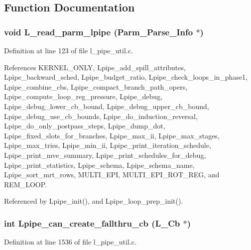 \subsection{Function Documentation}
\subsubsection{\setlength{\rightskip}{0pt plus 5cm}void L\_\-read\_\-parm\_\-lpipe (Parm\_\-Parse\_\-Info $\ast$)}\label{l__pipe__util_8h_38ba5bc4aa0dd1d12f1f16934a3137b1}




Definition at line 123 of file l\_\-pipe\_\-util.c.

References KERNEL\_\-ONLY, Lpipe\_\-add\_\-spill\_\-attributes, Lpipe\_\-backward\_\-sched, Lpipe\_\-budget\_\-ratio, Lpipe\_\-check\_\-loops\_\-in\_\-phase1, Lpipe\_\-combine\_\-cbs, Lpipe\_\-compact\_\-branch\_\-path\_\-opers, Lpipe\_\-compute\_\-loop\_\-reg\_\-pressure, Lpipe\_\-debug, Lpipe\_\-debug\_\-lower\_\-cb\_\-bound, Lpipe\_\-debug\_\-upper\_\-cb\_\-bound, Lpipe\_\-debug\_\-use\_\-cb\_\-bounds, Lpipe\_\-do\_\-induction\_\-reversal, Lpipe\_\-do\_\-only\_\-postpass\_\-steps, Lpipe\_\-dump\_\-dot, Lpipe\_\-fixed\_\-slots\_\-for\_\-branches, Lpipe\_\-max\_\-ii, Lpipe\_\-max\_\-stages, Lpipe\_\-max\_\-tries, Lpipe\_\-min\_\-ii, Lpipe\_\-print\_\-iteration\_\-schedule, Lpipe\_\-print\_\-mve\_\-summary, Lpipe\_\-print\_\-schedules\_\-for\_\-debug, Lpipe\_\-print\_\-statistics, Lpipe\_\-schema, Lpipe\_\-schema\_\-name, Lpipe\_\-sort\_\-mrt\_\-rows, MULTI\_\-EPI, MULTI\_\-EPI\_\-ROT\_\-REG, and REM\_\-LOOP.

Referenced by Lpipe\_\-init(), and Lpipe\_\-loop\_\-prep\_\-init().
\subsubsection{\setlength{\rightskip}{0pt plus 5cm}int Lpipe\_\-can\_\-create\_\-fallthru\_\-cb (L\_\-Cb $\ast$)}\label{l__pipe__util_8h_b7d0f47ef87d55f7475d9445aecd6fb4}




Definition at line 1536 of file l\_\-pipe\_\-util.c.

